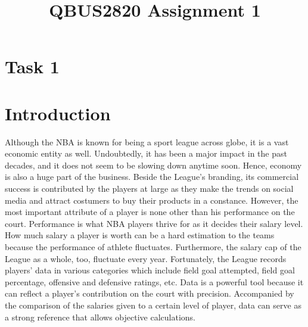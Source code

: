 \documentclass[letterpaper,12pt,twoside,]{pinp}
\title{QBUS2820 Assignment 1}
\author[]{}
\begin{document}
\verticaladjustment{-2pt}

\maketitle
\thispagestyle{firststyle}



\hypertarget{task-1}{%
\section{Task 1}\label{task-1}}

\hypertarget{introduction}{%
\section{Introduction}\label{introduction}}

Although the NBA is known for being a sport league across globe, it is a
vast economic entity as well. Undoubtedly, it has been a major impact in
the past decades, and it does not seem to be slowing down anytime soon.
Hence, economy is also a huge part of the business. Beside the League's
branding, its commercial success is contributed by the players at large
as they make the trends on social media and attract costumers to buy
their products in a constance. However, the most important attribute of
a player is none other than his performance on the court. Performance is
what NBA players thrive for as it decides their salary level. How much
salary a player is worth can be a hard estimation to the teams because
the performance of athlete fluctuates. Furthermore, the salary cap of
the League as a whole, too, fluctuate every year. Fortunately, the
League records players' data in various categories which include field
goal attempted, field goal percentage, offensive and defensive ratings,
etc. Data is a powerful tool because it can reflect a player's
contribution on the court with precision. Accompanied by the comparison
of the salaries given to a certain level of player, data can serve as a
strong reference that allows objective calculations.
\end{document}
